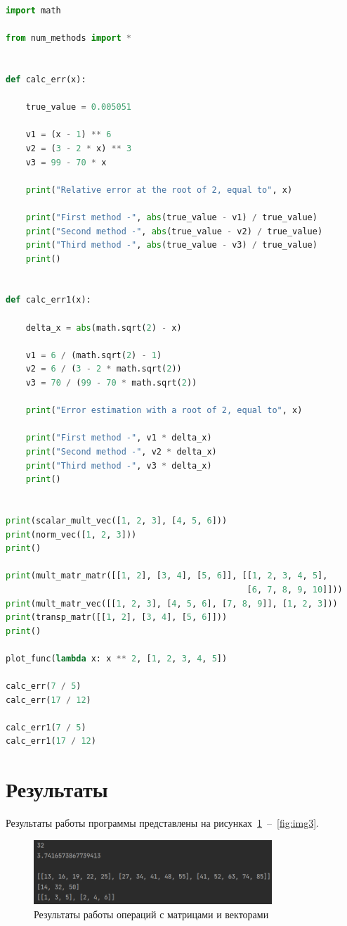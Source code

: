 \documentclass[a4paper, 14pt]{extarticle}
\begin{document}
\begin{lstlisting}[language={python},caption={Оценка погрешностей},label={lst:code2}]
import math

from num_methods import *


def calc_err(x):

    true_value = 0.005051

    v1 = (x - 1) ** 6
    v2 = (3 - 2 * x) ** 3
    v3 = 99 - 70 * x

    print("Relative error at the root of 2, equal to", x)

    print("First method -", abs(true_value - v1) / true_value)
    print("Second method -", abs(true_value - v2) / true_value)
    print("Third method -", abs(true_value - v3) / true_value)
    print()


def calc_err1(x):

    delta_x = abs(math.sqrt(2) - x)

    v1 = 6 / (math.sqrt(2) - 1)
    v2 = 6 / (3 - 2 * math.sqrt(2))
    v3 = 70 / (99 - 70 * math.sqrt(2))

    print("Error estimation with a root of 2, equal to", x)

    print("First method -", v1 * delta_x)
    print("Second method -", v2 * delta_x)
    print("Third method -", v3 * delta_x)
    print()


print(scalar_mult_vec([1, 2, 3], [4, 5, 6]))
print(norm_vec([1, 2, 3]))
print()

print(mult_matr_matr([[1, 2], [3, 4], [5, 6]], [[1, 2, 3, 4, 5],
                                                [6, 7, 8, 9, 10]]))
print(mult_matr_vec([[1, 2, 3], [4, 5, 6], [7, 8, 9]], [1, 2, 3]))
print(transp_matr([[1, 2], [3, 4], [5, 6]]))
print()

plot_func(lambda x: x ** 2, [1, 2, 3, 4, 5])

calc_err(7 / 5)
calc_err(17 / 12)

calc_err1(7 / 5)
calc_err1(17 / 12)

\end{lstlisting}

\section{Результаты}\label{Sect::res}

Результаты работы программы представлены на рисунках~\ref{fig:img1}~--~\ref{fig:img3}.

\begin{figure}[!htb]
	\centering
	\includegraphics[width=0.8\textwidth]{img1}
\caption{Результаты работы операций с матрицами и векторами}
\label{fig:img1}
\end{figure}
\end{document}
